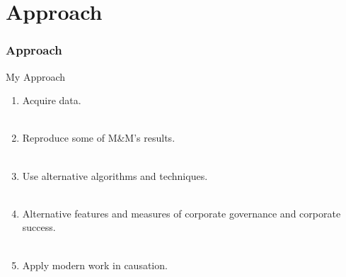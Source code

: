 \documentclass{beamer}
\begin{document}
\section{Approach}
\begin{frame}[t]
\frametitle{Approach}
My Approach
\begin{enumerate}
\item Acquire data. \\~\\
\item Reproduce some of M\&M's results. \\~\\
\item Use alternative algorithms and techniques. \\~\\
\item Alternative features and measures of corporate governance and corporate success. \\~\\
\item Apply modern work in causation.
\end{enumerate}



\end{frame}
\end{document}
